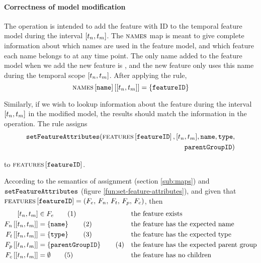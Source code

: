 \paragraph{Correctness of model modification}

The operation is intended to add the feature with ID  to the temporal feature model during the interval $\interval{t_n}{t_m}$. The $\textsc{names}{}$ map is meant to give complete information about which names are used in the feature model, and which feature each name belongs to at any time point. The only name added to the feature model when we add the new feature is , and the new feature only uses this name during the temporal scope $\interval{t_n}{t_m}$. After applying the rule, 
$$\lookup{\lookup{\names}{\var{name}}}{\interval{t_n}{t_m}} = \set{\var{featureID}}$$

Similarly, if we wish to lookup information about the feature during the interval $\interval{t_n}{t_m}$ in the modified model, the results should match the information in the operation. The rule assigns 
\begin{equation*}
   \begin{split}
   \var{setFeatureAttributes}(\lookup{\features{}}{\var{featureID}}, \interval{t_n}{t_m}, \var{name}, \var{type}, \\
   \var{parentGroupID})
   \end{split}
\end{equation*}

to $\textsc{features} \left[ \texttt{featureID} \right]$. 

\newpage {}

According to the semantics of assignment (section \vref{sub:maps}) and $\texttt{setFeatureAttributes}$ (figure \vref{fun:set-feature-attributes}), and given that $\textsc{features} \left[ \texttt{featureID} \right] = \left(F_e,\, F_n,\, F_t,\, F_p,\, F_c\right)$, then 
\begin{align}
   \interval{t_n}{t_m} &\in F_e \tag{1} \label{add-feature1} && \text{the feature exists}\\
   \lookup{F_n}{\interval{t_n}{t_m}} &= \set{\var{name}} \tag{2} \label{add-feature2} && \text{the feature has the expected name}\\
   \lookup{F_t}{\interval{t_n}{t_m}} &= \set{\var{type}} \tag{3} \label{add-feature3} && \text{the feature has the expected type} \\
   \lookup{F_p}{\interval{t_n}{t_m}} &= \set{\var{parentGroupID}} \tag{4} \label{add-feature4} && \text{the feature has the expected parent group} \\
   \lookup{F_c}{\interval{t_n}{t_m}} &= \emptyset \tag{5} \label{add-feature5} && \text{the feature has no children}
\end{align}

